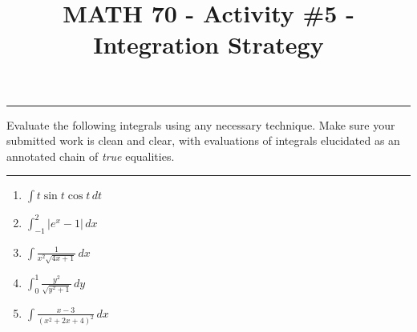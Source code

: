 \documentclass[12pt,oneside,english]{amsart}
\begin{document}
\title{MATH 70 - Activity \#5 - Integration Strategy}

\maketitle
\thispagestyle{empty}

\hrule

Evaluate the following integrals using any necessary technique. Make sure your submitted work is clean and clear, with evaluations of integrals elucidated as an annotated chain of \textit{true} equalities.

\medbreak
\hrule

\vspace{1cm}
\begin{enumerate}[leftmargin=*]
\setlength\itemsep{2cm}

\item $\displaystyle \int t\sin t\cos t\,dt$

\item $\displaystyle \int_{-1}^2|e^x-1|\,dx$

\item $\displaystyle \int\frac{1}{x^2\sqrt{4x+1}}\,dx$

\item $\displaystyle \int_0^1\frac{y^2}{\sqrt{y^2+1}}\,dy$

\item $\displaystyle \int\frac{x-3}{(x^2+2x+4)^2}\,dx$




\end{enumerate}
\end{document}
